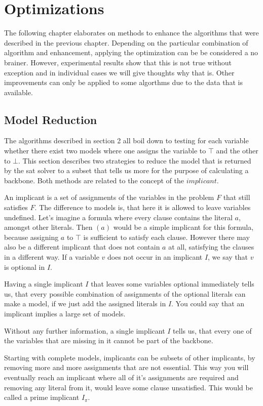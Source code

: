 \chapter{Optimizations}
The following chapter elaborates on methods to enhance the algorithms that were described in the previous chapter. Depending on the particular combination of algorithm and enhancement, applying the optimization can be be considered a no brainer. However, experimental results show that this is not true without exception and in individual cases we will give thoughts why that is. Other improvements can only be applied to some algorthms due to the data that is available.

\section{Model Reduction}

The algorithms described in section 2 all boil down to testing for each variable whether there exist two models where one assigns the variable to $\top$ and the other to $\bot$. This section describes two strategies to reduce the model that is returned by the sat solver to a subset that tells us more for the purpose of calculating a backbone. Both methods are related to the concept of the $implicant$.

An implicant is a set of assignments of the variables in the problem $F$ that still satisfies $F$. The difference to models is, that here it is allowed to leave variables undefined. Let's imagine a formula where every clause contains the literal $a$, amongst other literals. Then $(a)$ would be a simple implicant for this formula, because assigning $a$ to $\top$ is sufficient to satisfy each clause. However there may also be a different implicant that does not contain $a$ at all, satisfying the clauses in a different way. If a variable $v$ does not occur in an implicant $I$, we say that $v$ is optional in $I$.

Having a single implicant $I$ that leaves some variables optional immediately tells us, that every possible combination of assignments of the optional literals can make a model, if we just add the assigned literals in $I$. You could say that an implicant implies a large set of models.

Without any further information, a single implicant $I$ tells us, that every one of the variables that are missing in it cannot be part of the backbone.

Starting with complete models, implicants can be subsets of other implicants, by removing more and more assignments that are not essential. This way you will eventually reach an implicant where all of it's assignments are required and removing any literal from it, would leave some clause unsatisfied. This would be called a prime implicant $I_\pi$.

